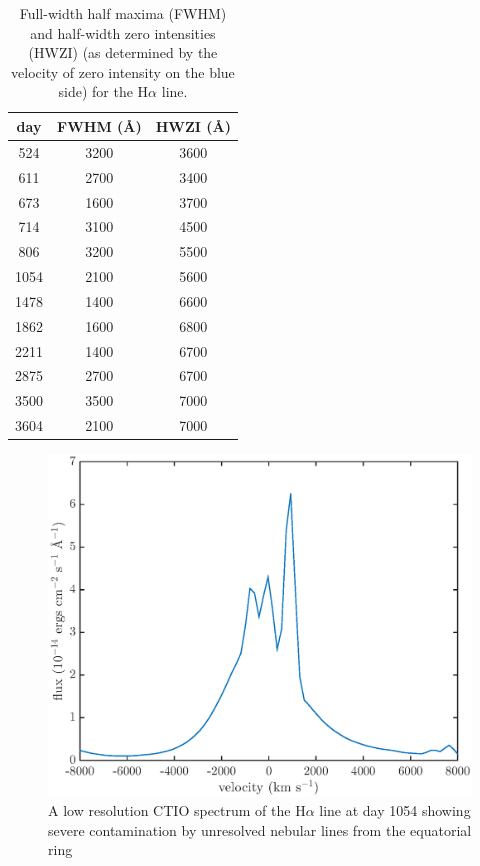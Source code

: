 \documentclass[useAMS,usenatbib,usegraphicx]{mnras}
\begin{document}
\begin{table}
\centering
\caption{Full-width half maxima (FWHM) and half-width zero intensities (HWZI) (as determined by the velocity of zero intensity on the blue side) for the H$\alpha$ line.}
\begin{tabular}{c cc}
day & FWHM (\AA) & HWZI (\AA) \\
\hline
524 & 3200 & 3600 \\
611 & 2700 & 3400 \\
673 & 1600 & 3700 \\
714 & 3100 & 4500 \\
806 & 3200 & 5500 \\
1054 & 2100 & 5600 \\
1478 & 1400 & 6600 \\
1862 & 1600 & 6800 \\
2211 & 1400 & 6700 \\
2875 & 2700 & 6700 \\
3500 & 3500 & 7000 \\
3604 & 2100 & 7000

\end{tabular}

\label{FWHM}
\end{table}%
 
 \begin{figure}
\begin{center}
\includegraphics[trim=38 7 35 20,clip=true,scale=0.49]{d1054Ha}
\caption{A low resolution CTIO spectrum of the H$\alpha$ line at day 1054 showing severe contamination by unresolved nebular lines from the equatorial ring}
\label{d1054}
\end{center}
\end{figure}
\end{document}
